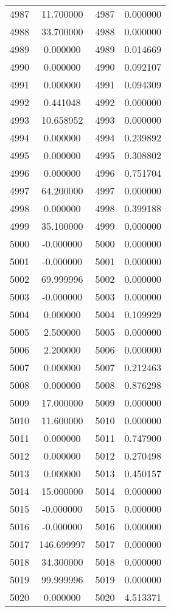 \documentclass[12pt]{article}
\begin{document}
\begin{longtable}{@{}cccc@{}}
4987 & 11.700000 & 4987 & 0.000000 \\
4988 & 33.700000 & 4988 & 0.000000 \\
4989 & 0.000000 & 4989 & 0.014669 \\
4990 & 0.000000 & 4990 & 0.092107 \\
4991 & 0.000000 & 4991 & 0.094309 \\
4992 & 0.441048 & 4992 & 0.000000 \\
4993 & 10.658952 & 4993 & 0.000000 \\
4994 & 0.000000 & 4994 & 0.239892 \\
4995 & 0.000000 & 4995 & 0.308802 \\
4996 & 0.000000 & 4996 & 0.751704 \\
4997 & 64.200000 & 4997 & 0.000000 \\
4998 & 0.000000 & 4998 & 0.399188 \\
4999 & 35.100000 & 4999 & 0.000000 \\
5000 & -0.000000 & 5000 & 0.000000 \\
5001 & -0.000000 & 5001 & 0.000000 \\
5002 & 69.999996 & 5002 & 0.000000 \\
5003 & -0.000000 & 5003 & 0.000000 \\
5004 & 0.000000 & 5004 & 0.109929 \\
5005 & 2.500000 & 5005 & 0.000000 \\
5006 & 2.200000 & 5006 & 0.000000 \\
5007 & 0.000000 & 5007 & 0.212463 \\
5008 & 0.000000 & 5008 & 0.876298 \\
5009 & 17.000000 & 5009 & 0.000000 \\
5010 & 11.600000 & 5010 & 0.000000 \\
5011 & 0.000000 & 5011 & 0.747900 \\
5012 & 0.000000 & 5012 & 0.270498 \\
5013 & 0.000000 & 5013 & 0.450157 \\
5014 & 15.000000 & 5014 & 0.000000 \\
5015 & -0.000000 & 5015 & 0.000000 \\
5016 & -0.000000 & 5016 & 0.000000 \\
5017 & 146.699997 & 5017 & 0.000000 \\
5018 & 34.300000 & 5018 & 0.000000 \\
5019 & 99.999996 & 5019 & 0.000000 \\
5020 & 0.000000 & 5020 & 4.513371 \\

\end{longtable}
\end{document}
